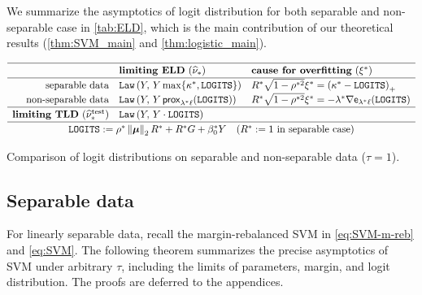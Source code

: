 We summarize the asymptotics of logit distribution for both separable and non-separable case in \cref{tab:ELD}, which is the main contribution of our theoretical results (\cref{thm:SVM_main} and \ref{thm:logistic_main}).
\begin{table}[h!]
\begin{equation*}
\renewcommand{\arraystretch}{1.2}
    \begin{array}{rll}
    \hline
           &  \textbf{limiting ELD} ~ (\hat\nu_*)  &  \textbf{cause for overfitting} ~ (\xi^*)   \\
    \hline
      \text{separable data}
          &  \Law\left( Y, \,  Y \max \{ \kappa^*, \mathtt{LOGITS} \} \right)
          &  R^* \sqrt{1 - \rho^{*2}} \xi^* = \left( \kappa^* - \mathtt{LOGITS} \right)_+  \\
      \text{non-separable data}
          &  \Law\left( Y, \,  Y \, \prox_{ \lambda^* \ell}( \mathtt{LOGITS} ) \right)
          &   R^* \sqrt{1 - \rho^{*2}} \xi^*  =  
            - \lambda^* \nabla \envelope_{ \lambda^* \ell}( \mathtt{LOGITS} ) \\
    \hline
          \textbf{limiting TLD} ~ (\hat\nu_*^\mathrm{test})
          &  \Law\left( Y, \,  Y \cdot \mathtt{LOGITS} \right)     &   \\
    \hline
    \multicolumn{3}{c}{\mathtt{LOGITS} := \rho^*\norm{\vmu}_2 R^* + R^*G + \beta_0^* Y 
    \quad \text{($R^* := 1$ in separable case)}
    }
    \end{array}
\end{equation*}
\vspace{-5mm}
\caption{Comparison of logit distributions on separable and non-separable data ($\tau = 1$).}
\label{tab:ELD}
\end{table}

\subsection{Separable data} \label{sec:logit_SVM}

For linearly separable data, recall the margin-rebalanced SVM in \cref{eq:SVM-m-reb} and \eqref{eq:SVM}. The following theorem summarizes the precise asymptotics of SVM under arbitrary $\tau$, including the limits of parameters, margin, and logit distribution. The proofs are deferred to the appendices.

